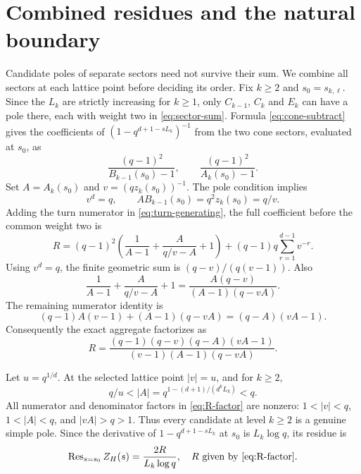 \section{Combined residues and the natural boundary}\label{sec:poles}
Candidate poles of separate sectors need not survive their sum.
We combine all sectors at each lattice point before deciding its
order. Fix $k\ge2$ and $s_0=s_{k,\ell}$. Since the $L_k$
are strictly increasing for $k\ge1$, only $C_{k-1}$, $C_k$
and $E_k$ can have a pole there, each with weight two in
\eqref{eq:sector-sum}. Formula \eqref{eq:cone-subtract} gives
the coefficients of $(1-q^{d+1-sL_k})^{-1}$ from the two
cone sectors, evaluated at $s_0$, as
\[
 \frac{(q-1)^2}{B_{k-1}(s_0)-1},\qquad
 \frac{(q-1)^2}{A_k(s_0)-1}.
\]
Set $A=A_k(s_0)$ and $v=(qz_k(s_0))^{-1}$. The pole
condition implies
\begin{equation}\label{eq:pole-relations}
 v^d=q,\qquad A B_{k-1}(s_0)=q^2z_k(s_0)=q/v.
\end{equation}
Adding the turn numerator in \eqref{eq:turn-generating},
the full coefficient before the common weight two is
\begin{equation}\label{eq:R-uncombined}
 R=(q-1)^2\left(\frac1{A-1}+\frac{A}{q/v-A}+1\right)
       +(q-1)q\sum_{r=1}^{d-1}v^{-r}.
\end{equation}
Using $v^d=q$, the finite geometric sum is
$(q-v)/(q(v-1))$. Also
\[
 \frac1{A-1}+\frac{A}{q/v-A}+1
 =\frac{A(q-v)}{(A-1)(q-vA)}.
\]
The remaining numerator identity is
\[
 (q-1)A(v-1)+(A-1)(q-vA)=(q-A)(vA-1).
\]
Consequently the exact aggregate factorizes as
\begin{equation}\label{eq:R-factor}
 R=\frac{(q-1)(q-v)(q-A)(vA-1)}
         {(v-1)(A-1)(q-vA)}.
\end{equation}

Let $u=q^{1/d}$. At the selected lattice point $|v|=u$, and
for $k\ge2$,
\begin{equation}\label{eq:modulus-gap}
 q/u<|A|=q^{1-(d+1)/(d^kL_k)}<q.
\end{equation}
All numerator and denominator factors in \eqref{eq:R-factor}
are nonzero: $1<|v|<q$, $1<|A|<q$, and $|vA|>q>1$.
Thus every candidate at level $k\ge2$ is a genuine simple pole.
Since the derivative of $1-q^{d+1-sL_k}$ at $s_0$ is
$L_k\log q$, its residue is
\begin{equation}\label{eq:residue}
 \operatorname{Res}_{s=s_0}Z_H(s)=\frac{2R}{L_k\log q},
 \quad R\text{ given by \eqref{eq:R-factor}}.
\end{equation}


